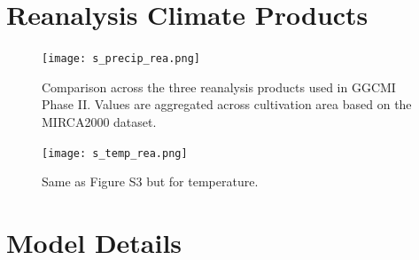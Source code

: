 \documentclass[10pt]{article}
\begin{document}
\clearpage
\section{Reanalysis Climate Products}
\begin{figure}[h!]
\centering
\texttt{[image: s\_precip\_rea.png]}
\caption{Comparison across the three reanalysis products used in GGCMI Phase II. Values are aggregated across cultivation area based on the MIRCA2000 dataset.}
\label{fig:precip_rea}
\end{figure}

\begin{figure}[h!]
\centering
\texttt{[image: s\_temp\_rea.png]}
\caption{Same as Figure S3 but for temperature.}
\label{fig:precip_rea}
\end{figure}


\clearpage
\section{Model Details}
\end{document}
